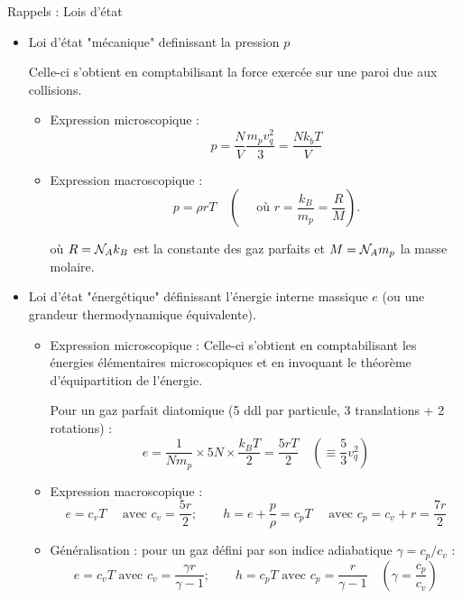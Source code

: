 \begin{frame}{Rappels : Lois d'état} 

\small 

\begin{itemize}

\item Loi d'état "mécanique" definissant la pression $p$

Celle-ci s'obtient en comptabilisant la force exercée sur une paroi due aux collisions.
\pause
\begin{itemize}

\item Expression microscopique : 
$$
\mbox{ } \quad 
p = \frac{N}{V} \frac{m_p v_q^2}{3} = \frac{N k_b T }{V }  
$$
 \pause
\item Expression macroscopique : 
$$ 
\mbox{ } \quad 
p = \rho r T \quad \left( \quad \mbox{ où }  r = \frac{k_B}{m_p} = \frac{R}{M} \right). 
$$

 où $R = {\cal N}_A k_B$ est la constante des gaz parfaits et $M ={\cal N}_A m_p $ la masse molaire. 
\end{itemize}
\pause
\item Loi d'état "énergétique" définissant l'énergie interne massique $e$ (ou une grandeur thermodynamique équivalente).
\begin{itemize}
\pause
\item 
Expression microscopique : Celle-ci s'obtient en comptabilisant les énergies élémentaires microscopiques 
 et en invoquant le théorème d'équipartition de l'énergie.

Pour un gaz parfait diatomique {\color{gray} (5 ddl par particule, 3 translations + 2 rotations)} :
$$
e = \frac{1}{N m_p} \times 5 N  \times \frac{k_B T}{2} = \frac{5 r T}{2} \quad \left( \equiv \frac{5}{3} v_q^2 \right)
$$

\pause
\item %
Expression macroscopique : 
$$ e = c_v T \quad \mbox{  avec } c_v = \frac{5 r}{2} ; \qquad  
h = e+ \frac{p}{\rho} = c_p T \quad \mbox{  avec } c_p= c_v + r = \frac{7 r}{2} 
$$
\pause

\item Généralisation : pour un gaz défini par son indice adiabatique $\gamma = c_p / c_v$ :
$$
e = c_v T \mbox{ avec } c_v = \frac{\gamma r }{\gamma -1} ; \qquad 
h = c_p T \mbox{ avec } c_p = \frac{ r }{\gamma -1}   \quad \left( \gamma = \frac{c_p}{c_v} \right)
$$
\end{itemize}



 \end{itemize}
\end{frame}




